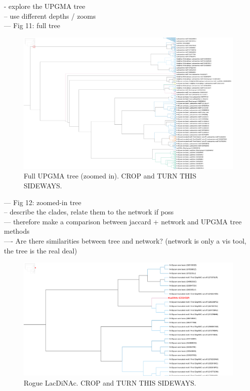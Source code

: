 \documentclass[12pt,a4paper]{article}
\begin{document}
- explore the UPGMA tree\\
-- use different depths / zooms\\
--- Fig 11: full tree\\

\begin{figure}
\centering 
\includegraphics[scale=0.3]{trees/zoomed_full_tree_cladogram.png} 
\caption{Full UPGMA tree (zoomed in). CROP and TURN THIS SIDEWAYS.}
\label{fig:full_tree}
\end{figure}
\clearpage


--- Fig 12: zoomed-in tree\\
-- describe the clades, relate them to the network if poss\\
--- therefore make a comparison between jaccard + network and UPGMA tree methods\\
---- Are there similarities between tree and network? (network is only a vis tool, the tree is the real deal) \\

\begin{figure}
\centering 
\includegraphics[scale=0.3]{trees/rogue_LacDiNAc_in_tree.png} 
\caption{Rogue LacDiNAc. CROP and TURN THIS SIDEWAYS.}
\label{fig:full_tree}
\end{figure}
\clearpage
\end{document}
